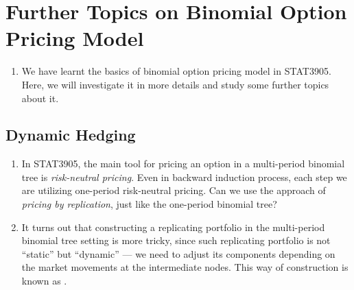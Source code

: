 \section{Further Topics on Binomial Option Pricing Model}
\label{sect:binom-model-further}
\begin{enumerate}
\item We have learnt the basics of binomial option pricing model in STAT3905.
Here, we will investigate it in more details and study some further topics
about it.
\end{enumerate}
\subsection{Dynamic Hedging}
\begin{enumerate}
\item In STAT3905, the main tool for pricing an option in a multi-period
binomial tree is \emph{risk-neutral pricing}. Even in backward induction
process, each step we are utilizing one-period risk-neutral pricing. Can we use
the approach of \emph{pricing by replication}, just like the one-period
binomial tree?

\item It turns out that constructing a replicating portfolio in the
multi-period binomial tree setting is more tricky, since such replicating
portfolio is not ``static'' but ``dynamic'' --- we need to adjust its
components depending on the market movements at the intermediate nodes. This
way of construction is known as .

\begin{center}
\end{center}


\end{enumerate}
